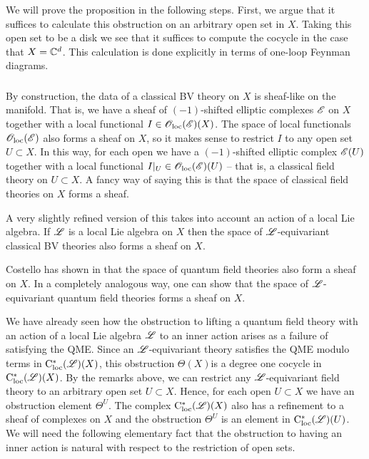 We will prove the proposition in the following steps. First, we argue that it suffices to calculate this obstruction on an arbitrary open set in $X$. Taking this open set to be a disk we see that it suffices to compute the cocycle in the case that $X = \mathbb C^d$. This calculation is done explicitly in terms of one-loop Feynman diagrams. 

\subsubsection{}

By construction, the data of a classical BV theory on $X$ is sheaf-like on the manifold. That is, we have a sheaf of $(-1)$-shifted elliptic complexes $\mathscr E$ on $X$ together with a local functional $I \in {\mathscr O}_{\rm loc}(\mathscr E)(X)$. The space of local functionals ${\mathscr O}_{\rm loc}(\mathscr E)$ also forms a sheaf on $X$, so it makes sense to restrict $I$ to any open set $U \subset X$. In this way, for each open we have a $(-1)$-shifted elliptic complex $\mathscr E(U)$ together with a local functional $I |_{U}\in {\mathscr O}_{\rm loc}(\mathscr E)(U)$ -- that is, a classical field theory on $U \subset X$. A fancy way of saying this is that the space of classical field theories on $X$ forms a sheaf. 

A very slightly refined version of this takes into account an action of a local Lie algebra. If $\mathscr L$ is a local Lie algebra on $X$ then the space of $\mathscr L$-equivariant classical BV theories also forms a sheaf on $X$. 

Costello has shown in \cite{cosren} that the space of quantum field theories also form a sheaf on $X$. In a completely analogous way, one can show that the space of $\mathscr L$-equivariant quantum field theories forms a sheaf on $X$. 

We have already seen how the obstruction to lifting a quantum field theory with an action of a local Lie algebra $\mathscr L$ to an inner action arises as a failure of satisfying the QME. Since an $\mathscr L$-equivariant theory satisfies the QME modulo terms in ${\rm C}_{\rm loc}^*(\mathscr L)(X)$, this obstruction $\Theta(X)$is a degree one cocycle in ${\rm C}_{\rm loc}^*(\mathscr L)(X)$. By the remarks above, we can restrict any $\mathscr L$-equivariant field theory to an arbitrary open set $U \subset X$. Hence, for each open $U \subset X$ we have an obstruction element $\Theta^U$. The complex ${\rm C}_{\rm loc}^*(\mathscr L)(X)$ also has a refinement to a sheaf of complexes on $X$ and the obstruction $\Theta^U$ is an element in ${\rm C}_{\rm loc}^*(\mathscr L)(U)$. We will need the following elementary fact that the obstruction to having an inner action is natural with respect to the restriction of open sets.

